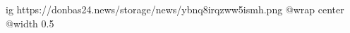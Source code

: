  
 
 
 
 

\ifcmt
  ig https://donbas24.news/storage/news/ybnq8irqzww5ismh.png
  @wrap center
  @width 0.5
\fi
